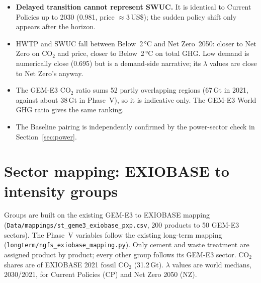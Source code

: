 \documentclass[11pt,a4paper]{article}
\newcommand{\code}[1]{\texttt{#1}}
\begin{document}
\begin{itemize}
  \item \textbf{Delayed transition cannot represent SWUC.} It is identical to
        Current Policies up to 2030 (0.981, price $\approx 3$\,US\$); the
        sudden policy shift only appears after the horizon.
  \item HWTP and SWUC fall between Below~2\,°C and Net Zero~2050: closer to
        Net Zero on CO$_2$ and price, closer to Below~2\,°C on total GHG.
        Low demand is numerically close (0.695) but is a demand-side
        narrative; its $\lambda$ values are close to Net Zero's anyway.
  \item The GEM-E3 CO$_2$ ratio sums 52 partly overlapping regions (67\,Gt in
        2021, against about 38\,Gt in Phase~V), so it is indicative only. The
        GEM-E3 World GHG ratio gives the same ranking.
  \item The Baseline pairing is independently confirmed by the power-sector
        check in Section~\ref{sec:power}.
\end{itemize}

\section{Sector mapping: EXIOBASE to intensity groups}
\label{sec:sectors}

Groups are built on the existing GEM-E3 to EXIOBASE mapping
(\code{Data/mappings/st\_geme3\_exiobase\_pxp.csv}, 200 products to 50 GEM-E3
sectors). The Phase~V variables follow the existing long-term mapping
(\code{longterm/ngfs\_exiobase\_mapping.py}). Only cement and waste treatment
are assigned product by product; every other group follows its GEM-E3 sector.
CO$_2$ shares are of EXIOBASE 2021 fossil CO$_2$ (31.2\,Gt). $\lambda$ values
are world medians, 2030/2021, for Current Policies (CP) and Net Zero 2050 (NZ).
\end{document}
